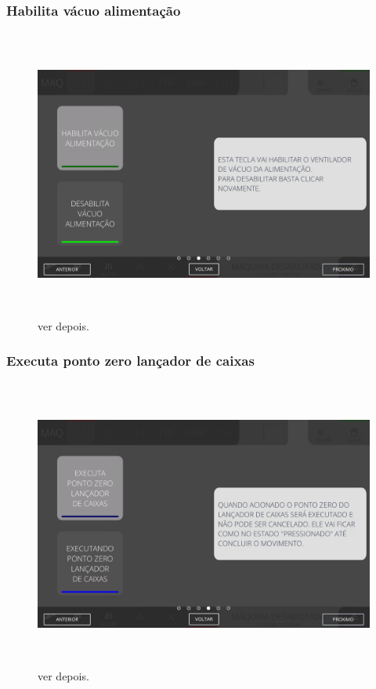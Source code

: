 \newpage
\thispagestyle{fancy}
\vspace*{\fill}
\subsubsection{\small{Habilita vácuo alimentação}}
\begin{figure}[h]
  \centering
  \includegraphics[width=576px,height=360px]{src/imagesFlexo/03-feeder/commands/e-3.png}
  \caption{ver depois.}
   \label{}
\end{figure}
\vspace*{\fill}

\newpage
\thispagestyle{fancy}
\vspace*{\fill}
\subsubsection{\small{Executa ponto zero lançador de caixas}}
\begin{figure}[h]
  \centering
  \includegraphics[width=576px,height=360px]{src/imagesFlexo/03-feeder/commands/e-4.png}
  \caption{ver depois.}
   \label{}
\end{figure}
\vspace*{\fill}

